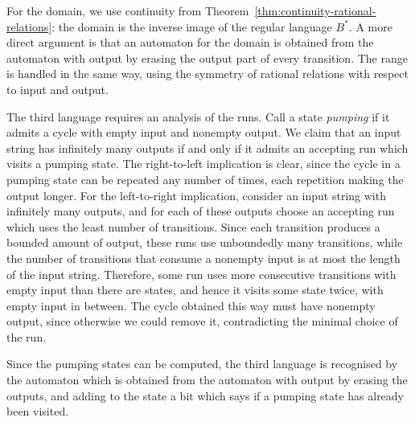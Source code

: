 {
    For the domain, we use continuity from Theorem~\ref{thm:continuity-rational-relations}: the domain is the inverse image of the regular language $B^*$. A more direct argument is that an automaton for the domain is obtained from the automaton with output by erasing the output part of every transition. The range is handled in the same way, using the symmetry of rational relations with respect to input and output.

    The third language requires an analysis of the runs. Call a state \emph{pumping} if it admits a cycle with empty input and nonempty output. We claim that an input string has infinitely many outputs if and only if it admits an accepting run which visits a pumping state. The right-to-left implication is clear, since the cycle in a pumping state can be repeated any number of times, each repetition making the output longer. For the left-to-right implication, consider an input string with infinitely many outputs, and for each of these outputs choose an accepting run which uses the least number of transitions. Since each transition produces a bounded amount of output, these runs use unboundedly many transitions, while the number of transitions that consume a nonempty input is at most the length of the input string. Therefore, some run uses more consecutive transitions with empty input than there are states, and hence it visits some state twice, with empty input in between. The cycle obtained this way must have nonempty output, since otherwise we could remove it, contradicting the minimal choice of the run.

    Since the pumping states can be computed, the third language is recognised by the automaton which is obtained from the automaton with output by erasing the outputs, and adding to the state a bit which says if a pumping state has already been visited.
}


